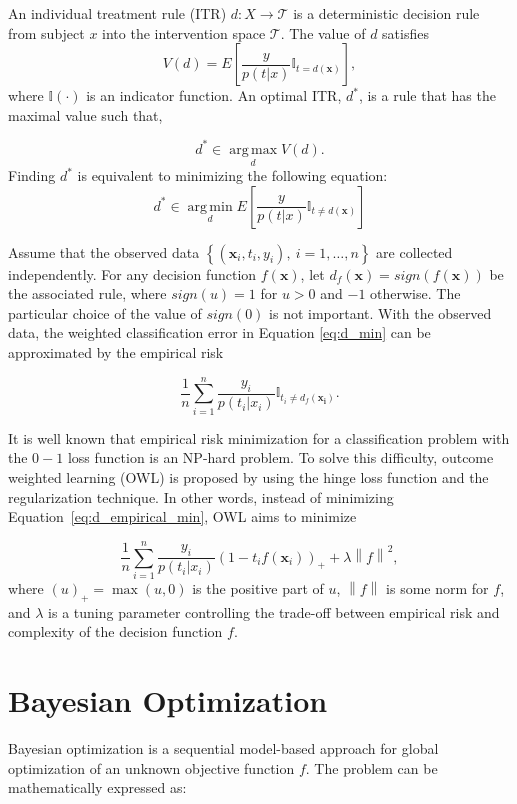 \documentclass{article}
\begin{document}
An individual treatment rule (ITR) $d: X \rightarrow \mathcal{T}$ is a deterministic decision
rule from subject $x$ into the intervention space $\mathcal{T}$. The
value of $d$ satisfies
$$V(d) = E \left [ \frac{y}{p(t|x)}\mathbb{I}_{t=d(\mathbf{x})}\right
],$$
where $\mathbb{I}(\cdot)$ is an indicator function. An optimal ITR, $d^{*}$, is a rule that has the maximal value such
that,

$$d^{*} \in \operatorname*{arg\,max}_d V(d).$$
Finding $d^{*}$ is equivalent to minimizing the following equation:
\begin{equation} \label{eq:d_min}
d^{*} \in \operatorname*{arg\,min}_d E \left [
  \frac{y}{p(t|x)}\mathbb{I}_{t \neq d(\mathbf{x})}\right
]
\end{equation}

Assume that the observed data $\left \{
  (\mathbf{x}_i,t_i,y_i),~i=1,\ldots , n \right \}$ are collected
independently. For any decision function $f(\mathbf{x})$, let
$d_f(\mathbf{x}) = sign(f(\mathbf{x}))$ be the associated rule, where
$sign(u) = 1$ for $u > 0$ and $-1$ otherwise. The particular choice of
the value of $sign(0)$ is not important. With the observed data, the
weighted classification error in Equation \ref{eq:d_min} can be approximated by
the empirical risk

\begin{equation} \label{eq:d_empirical_min}
  \frac{1}{n}\sum_{i=1}^{n}\frac{y_i}{p(t_i|x_i)}\mathbb{I}_{t_i \neq
    d_f(\mathbf{x_i})} .
\end{equation}

It is well known that empirical risk minimization for a classification
problem with the $0-1$ loss function is an NP-hard problem. To solve
this difficulty, outcome weighted learning (OWL) is proposed by
\cite{zhao2012estimating} using the hinge loss function and the
regularization technique. In other words, instead of minimizing
Equation~\ref{eq:d_empirical_min}, OWL aims to minimize

\begin{equation} \label{eq:d_owl_empirical_min}
  \frac{1}{n}\sum_{i=1}^{n}\frac{y_i}{p(t_i|x_i)}(1-t_if(\mathbf{x}_i))_{+}+\lambda\left
    \| f \right \|^2 ,
\end{equation}
where $(u)_+=\max(u,0)$ is the positive part of $u$, $\left \| f
\right \|$ is some norm for $f$, and $\lambda$ is a tuning parameter
controlling the trade-off between empirical risk and complexity of the
decision function $f$.

\section{Bayesian Optimization}
Bayesian optimization is a sequential model-based approach for global
optimization of an unknown objective function $f$. The problem can be
mathematically expressed as:
\end{document}
